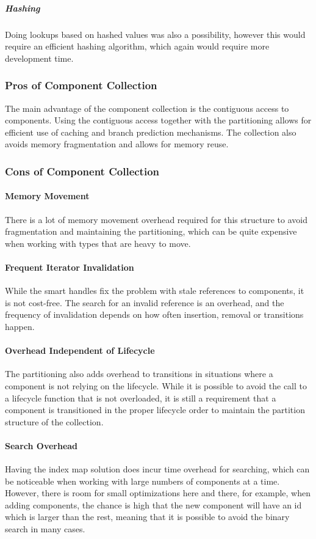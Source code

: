 \subparagraph{Hashing}
Doing lookups based on hashed values was also a possibility, however this would require an efficient hashing algorithm,
which again would require more development time.

\subsubsection{Pros of Component Collection}
The main advantage of the component collection is the contiguous access to components.
Using the contiguous access together with the partitioning allows for efficient use of caching and branch prediction mechanisms.
The collection also avoids memory fragmentation and allows for memory reuse.

\subsubsection{Cons of Component Collection}
\paragraph{Memory Movement}
There is a lot of memory movement overhead required for this structure to avoid fragmentation and maintaining the partitioning, which can be quite expensive when working with types that are heavy to move.

\paragraph{Frequent Iterator Invalidation}
While the smart handles fix the problem with stale references to components, it is not cost-free.
The search for an invalid reference is an overhead, and the frequency of invalidation depends on how often insertion,
removal or transitions happen.

\paragraph{Overhead Independent of Lifecycle}
The partitioning also adds overhead to transitions in situations where a component is not relying on the lifecycle.
While it is possible to avoid the call to a lifecycle function that is not overloaded, it is still a requirement that a component is transitioned in the proper lifecycle order to maintain the partition structure of the collection.

\paragraph{Search Overhead}
Having the index map solution does incur time overhead for searching, which can be noticeable when working with
large numbers of components at a time. However, there is room for small optimizations here and there, for example, when adding components, the chance is high that the new component will have an id which is larger than the rest, meaning that it is possible to avoid the binary search in many cases.
